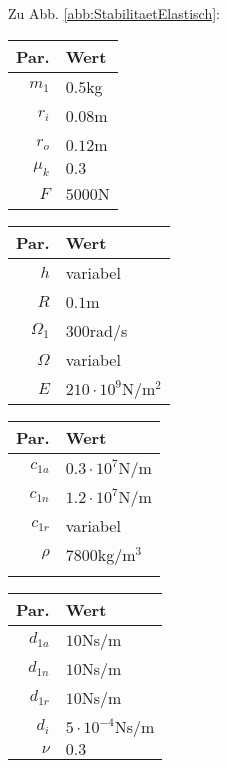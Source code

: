 Zu Abb. \ref{abb:StabilitaetElastisch}: 
\begin{center}
	\begin{tabular}{r|l}
		Par.&Wert\\\hline
		$m_1$&$0.5$kg\\
		$r_i$&$0.08$m\\
		$r_o$&$0.12$m\\
		$\mu_k$& $0.3$\\
		$F$&$5000$N\\
	\end{tabular}\hfill
	\begin{tabular}{r|l}
		Par.&Wert\\\hline
		$h$&variabel\\
		$R$&$0.1$m\\
		$\Omega_1$&$300$rad/s\\
		$\Omega$& variabel \\
		$E$&$210\cdot10^9$N/m$^2$\\
	\end{tabular}\hfill
	\begin{tabular}{r|l}
		Par.&Wert\\\hline
		$c_{1a}$&$0.3\cdot10^{7}$N/m\\
		$c_{1n}$&$1.2\cdot10^{7}$N/m\\
		$c_{1r}$&variabel\\
		$\rho$&$7800$kg/m$^3$\\
		&
	\end{tabular}\hfill
	\begin{tabular}{r|l}
		Par.&Wert\\\hline
		$d_{1a}$&$10$Ns/m\\
		$d_{1n}$&$10$Ns/m\\
		$d_{1r}$&$10$Ns/m\\
		$d_i$ &$5\cdot10^{-4}$Ns/m\\
		$\nu$&$0.3$\\
	\end{tabular}
\end{center}

